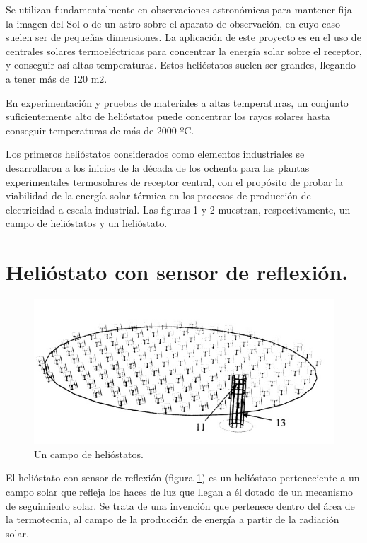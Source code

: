 Se utilizan fundamentalmente en observaciones astronómicas para mantener fija la imagen del Sol o de un astro sobre el aparato de observación, en cuyo caso suelen ser de pequeñas dimensiones. La aplicación de este proyecto es en el uso de centrales solares termoeléctricas para concentrar la energía solar sobre el receptor, y conseguir así altas temperaturas. Estos helióstatos suelen ser grandes, llegando a tener más de 120 m2.

En experimentación y pruebas de materiales a altas temperaturas, un conjunto suficientemente alto de helióstatos puede concentrar los rayos solares hasta conseguir temperaturas de más de 2000 ºC.

Los primeros helióstatos considerados como elementos industriales se desarrollaron a los inicios de la década de los ochenta para las plantas experimentales termosolares de receptor central, con el propósito de probar la viabilidad de la energía solar térmica en los procesos de producción de electricidad a escala industrial. Las figuras 1 y 2 muestran, respectivamente, un campo de helióstatos y un helióstato.

\section{Helióstato con sensor de reflexión.}

\begin{figure}[h!]
  	\centering
	\includegraphics[scale=0.7]{FotosPaginasWebHeliostatos/unnamed(1).jpg}
	\caption{Un campo de helióstatos.~\cite{OepmWebSite} \label{fig:FotosPaginasWebHeliostatos/unnamed(1).jpg}}
\end{figure}

El helióstato con sensor de reflexión (figura \ref{fig:FotosPaginasWebHeliostatos/unnamed(1).jpg}) es un helióstato perteneciente a un campo solar que refleja los haces de luz que llegan a él dotado de un mecanismo de seguimiento solar. Se trata de una invención que pertenece dentro del área de la termotecnia, al campo de la producción de energía a partir de la radiación solar.

